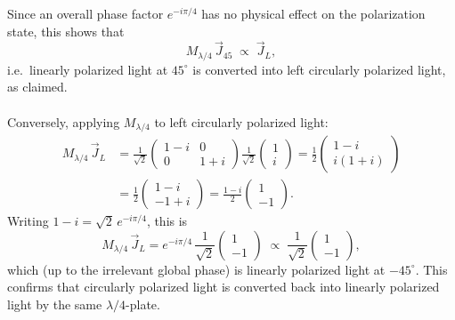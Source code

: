 Since an overall phase factor $e^{-i\pi/4}$ has no physical effect on the
polarization state, this shows that
\begin{equation}
    M_{\lambda/4}\,\vec{J}_{45} \;\propto\; \vec{J}_L,
\end{equation}
i.e.\ linearly polarized light at $45^\circ$ is converted into left
circularly polarized light, as claimed.
\\
\\
Conversely, applying $M_{\lambda/4}$ to left circularly polarized light:
\begin{equation}
    \begin{split}
    M_{\lambda/4}\,\vec{J}_{L}
    &= \frac{1}{\sqrt{2}}
    \begin{pmatrix} 1-i & 0 \\ 0 & 1+i \end{pmatrix}
    \frac{1}{\sqrt{2}}\begin{pmatrix} 1 \\ i \end{pmatrix}
    = \frac{1}{2}\begin{pmatrix} 1-i \\ i(1+i) \end{pmatrix}\\
    &= \frac{1}{2}\begin{pmatrix} 1-i \\ -1+i \end{pmatrix}
    = \frac{1-i}{2}\begin{pmatrix} 1 \\ -1 \end{pmatrix}.
    \end{split}
\end{equation}
Writing $1-i = \sqrt{2}\,e^{-i\pi/4}$, this is
\begin{equation}
    M_{\lambda/4}\,\vec{J}_L
    = e^{-i\pi/4}\,\frac{1}{\sqrt{2}}\begin{pmatrix} 1 \\ -1 \end{pmatrix}
    \;\propto\;
    \frac{1}{\sqrt{2}}\begin{pmatrix} 1 \\ -1 \end{pmatrix},
\end{equation}
which (up to the irrelevant global phase) is linearly polarized light at
$-45^\circ$. This confirms that circularly polarized light is converted
back into linearly polarized light by the same $\lambda/4$-plate.
